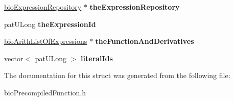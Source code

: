 \begin{DoxyCompactItemize}
\item 
\mbox{\label{structbio_thread_arg_a3ee1c7e4a78aef1c238db0eca9346551}} 
\hyperlink{classbio_expression_repository}{bio\+Expression\+Repository} $\ast$ {\bfseries the\+Expression\+Repository}
\item 
\mbox{\label{structbio_thread_arg_aac712c326d861d276684bb0dd538500b}} 
pat\+U\+Long {\bfseries the\+Expression\+Id}
\item 
\mbox{\label{structbio_thread_arg_ad96c4aafc21b7f6349e1731ab1b4e845}} 
\hyperlink{classbio_arith_list_of_expressions}{bio\+Arith\+List\+Of\+Expressions} $\ast$ {\bfseries the\+Function\+And\+Derivatives}
\item 
\mbox{\label{structbio_thread_arg_afa54b2f14c3dad657b2b4250a8126486}} 
vector$<$ pat\+U\+Long $>$ {\bfseries literal\+Ids}
\end{DoxyCompactItemize}


The documentation for this struct was generated from the following file\+:\begin{DoxyCompactItemize}
\item 
bio\+Precompiled\+Function.\+h\end{DoxyCompactItemize}
